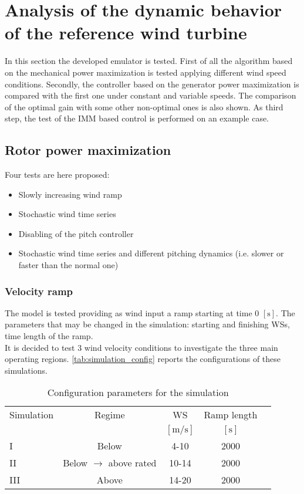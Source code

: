 \newpage
\section{Analysis of the dynamic behavior of the reference wind turbine}\label{sec:c_basic_model_simulation}
In this section the developed emulator is tested. First of all the algorithm based on the mechanical power maximization is tested applying different wind speed conditions. Secondly, the controller based on the generator power maximization is compared with the first one under constant and variable speeds. The comparison of the optimal gain with some other non-optimal ones is also shown. As third step, the test of the IMM based control is performed on an example case. 
                                                  
\subsection{Rotor power maximization}
Four tests are here proposed:
\begin{itemize}
  \item Slowly increasing wind ramp
  \item Stochastic wind time series
  \item Disabling of the pitch controller
  \item Stochastic wind time series and different pitching dynamics (i.e. slower or faster than the normal one)
\end{itemize}

\subsubsection{Velocity ramp}
The model is tested providing as wind input a ramp starting at time 0 $\left[\si{\second}\right]$. The parameters that may be changed in the simulation: starting and finishing WSs, time length of the ramp.\\
It is decided to test 3 wind velocity conditions to investigate the three main operating regions. \autoref{tab:simulation_config} reports the configurations of these simulations. 
\begin{table}[!htbp]
    \caption{Configuration parameters for the simulation}
    \centering
    \begin{tabular}{lcccc}
    \toprule
      Simulation & Regime  & WS & Ramp length \\ 
       & & $\left[\si{\meter\per\second}\right]$ & $\left[\si{\second}\right]$ \\ \midrule       
       I & Below & 4-10 & 2000  \\
       II & Below $\rightarrow$ above rated & 10-14 & 2000 \\
       III & Above & 14-20 & 2000  \\
       \bottomrule
    \end{tabular}
    \label{tab:simulation_config}
\end{table}

